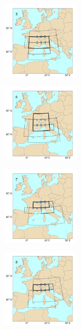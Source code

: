 \documentclass{ametsoc}
\begin{document}
\begin{figure}[htb]
	\begin{subfigure}{.5\columnwidth}
		\centering
		\includegraphics[width=3.9cm]{figures/spatial_win_z4-hi2/Spatial_windows_5.png}
	\end{subfigure}%
	\begin{subfigure}{.5\columnwidth}
		\centering
		\includegraphics[width=3.9cm]{figures/spatial_win_z4-hi2/Spatial_windows_6.png}
	\end{subfigure}
	\begin{subfigure}{.5\columnwidth}
		\centering
		\includegraphics[width=3.9cm]{figures/spatial_win_z4-hi2/Spatial_windows_7.png}
	\end{subfigure}%
	\begin{subfigure}{.5\columnwidth}
		\centering
		\includegraphics[width=3.9cm]{figures/spatial_win_z4-hi2/Spatial_windows_8.png}
	\end{subfigure}
	\begin{subfigure}{.5\columnwidth}

\end{subfigure}
\end{figure}
\end{document}
